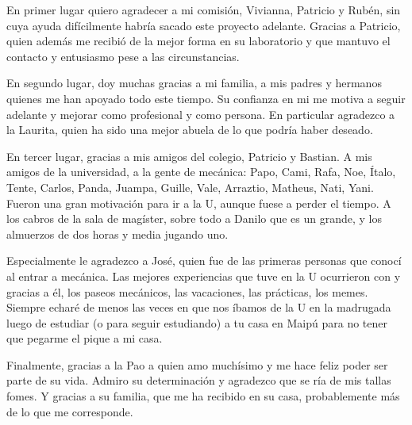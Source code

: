En primer lugar quiero agradecer a mi comisión, Vivianna, Patricio y Rubén, sin cuya ayuda difícilmente habría sacado este proyecto adelante. Gracias a Patricio, quien además me recibió de la mejor forma en su laboratorio y que mantuvo el contacto y entusiasmo pese a las circunstancias.

En segundo lugar, doy muchas gracias a mi familia, a mis padres y hermanos quienes me han apoyado todo este tiempo. Su confianza en mi me motiva a seguir adelante y mejorar como profesional y como persona. En particular agradezco a la Laurita, quien ha sido una mejor abuela de lo que podría haber deseado.  

En tercer lugar, gracias a mis amigos del colegio, Patricio y Bastian. A mis amigos de la universidad, a la gente de mecánica: Papo, Cami, Rafa, Noe, Ítalo, Tente, Carlos, Panda, Juampa, Guille, Vale, Arraztio, Matheus, Nati, Yani. Fueron una gran motivación para ir a la U, aunque fuese a perder el tiempo. A los cabros de la sala de magíster, sobre todo a Danilo que es un grande, y los almuerzos de dos horas y media jugando uno.

Especialmente le agradezco a José, quien fue de las primeras personas que conocí al entrar a mecánica. Las mejores experiencias que tuve en la U ocurrieron con y gracias a él, los paseos mecánicos, las vacaciones, las prácticas, los memes. Siempre echaré de menos las veces en que nos íbamos de la U en la madrugada luego de estudiar (o para seguir estudiando) a tu casa en Maipú para no tener que pegarme el pique a mi casa.

Finalmente, gracias a la Pao a quien amo muchísimo y me hace feliz poder ser parte de su vida. Admiro su determinación y agradezco que se ría de mis tallas fomes. Y gracias a su familia, que me ha recibido en su casa, probablemente más de lo que me corresponde.